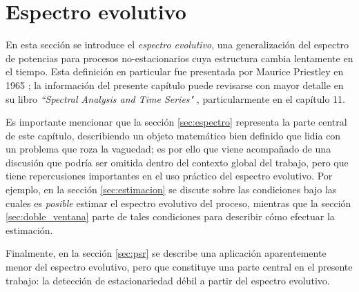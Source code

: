 
\chapter{Espectro evolutivo}
\label{capitulo:espectro_evo}

En esta sección se introduce el \textit{espectro evolutivo}, una generalización del espectro de 
potencias para procesos no-estacionarios cuya estructura cambia lentamente en el tiempo.
%
Esta definición en particular fue presentada por Maurice Priestley en 1965 \cite{Priestley65}; la
información del presente capítulo puede revisarse con mayor detalle en su libro \textit{``Spectral
Analysis and Time Series"} \cite{Priestley81}, particularmente en el capítulo 11.


Es importante mencionar que la sección \ref{sec:espectro} representa la parte central de este
capítulo, describiendo un objeto matemático bien definido que lidia con un problema que roza la 
vaguedad; es por ello que viene acompañado de una discusión que podría ser omitida dentro del 
contexto global del trabajo, pero que tiene repercusiones importantes en el uso práctico del 
espectro evolutivo.
%
Por ejemplo, en la sección \ref{sec:estimacion} se discute sobre las condiciones bajo las cuales es 
\textit{posible} estimar el espectro evolutivo del proceso, mientras que la sección 
\ref{sec:doble_ventana} parte de tales condiciones para describir cómo efectuar la estimación.

Finalmente, en la sección \ref{sec:psr} se describe una aplicación aparentemente menor del espectro 
evolutivo, pero que constituye una parte central en el presente trabajo: la detección de 
estacionariedad débil a partir del espectro evolutivo.


